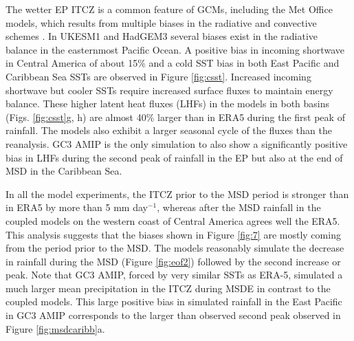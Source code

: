 
The wetter EP ITCZ is a common feature of GCMs, including the Met Office models, which results from multiple biases in the radiative and convective schemes \citep{oueslati2013,li2014}. %
 In UKESM1 and HadGEM3 several biases exist in the radiative balance in the easternmost Pacific Ocean. A positive bias in incoming shortwave in Central America of about 15\% and a cold SST bias in both East Pacific and Caribbean Sea SSTs are observed in Figure \ref{fig:csst}. Increased incoming shortwave but cooler SSTs require increased surface fluxes to maintain energy balance. These higher latent heat fluxes (LHFs) in the models in both basins (Figs. \ref{fig:csst}g, h) are almost 40\% larger than in ERA5 during the first peak of rainfall. The models also exhibit a larger seasonal cycle of the fluxes than the reanalysis. GC3 AMIP is the only simulation to also show a significantly positive bias in LHFs during the second peak of rainfall in the EP but also at the end of MSD in the Caribbean Sea. 


In all the model experiments, the ITCZ prior to the MSD period is stronger than in ERA5 by more than 5 mm day$^{-1}$, whereas after the MSD rainfall in the coupled models on the western coast of Central America agrees well the ERA5. 
This analysis suggests that the biases shown in Figure \ref{fig:7} are mostly coming from the period prior to the MSD. The models reasonably simulate the decrease in rainfall during the MSD (Figure \ref{fig:eof2}) followed by the second increase or peak. 
Note that GC3 AMIP, forced by very similar SSTs as ERA-5, simulated a much larger mean precipitation in the ITCZ during MSDE in contrast to the coupled models. This large positive bias in simulated rainfall in the East Pacific in GC3 AMIP corresponds to the larger than observed second peak observed in Figure \ref{fig:msdcaribb}a. 


